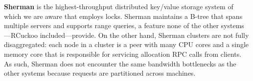 \textbf{Sherman} is the highest-throughput distributed key/value
storage system of which we are aware that employs locks.  Sherman
maintains a B-tree that spans multiple servers and supports range
queries, a feature none of the other systems---RCuckoo
included---provide.
On the other
hand, Sherman clusters are not fully disaggregated: each node in a
cluster is a peer with many CPU cores and a single memory core
that is responsible for servicing allocation RPC calls from clients.
As such, Sherman does not encounter the same bandwidth bottlenecks as
the other systems because requests are partitioned across
machines.








